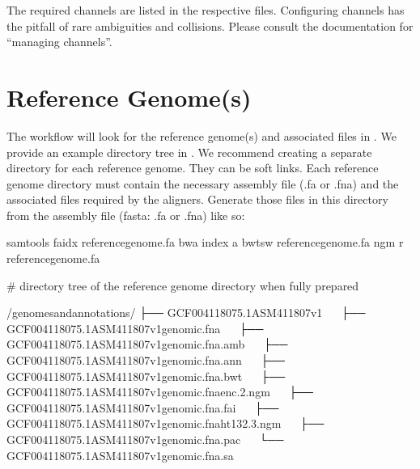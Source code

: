 \documentclass[letterpaper,10pt,english]{sphinxmanual}
\begin{document}
The required channels are listed in the respective  files. Configuring channels has the pitfall of rare ambiguities and collisions. Please consult the  documentation for “managing channels”.


\section{Reference Genome(s)}
\label{\detokenize{index:reference-genome-s}}
The workflow will look for the reference genome(s) and associated files in . We provide an example directory tree in . We recommend creating a separate directory for each reference genome. They can be soft links. Each reference genome directory must contain the necessary assembly file (.fa or .fna) and the associated files required by the aligners. Generate those files in this directory from the assembly file (fasta: .fa or .fna) like so:

\begin{sphinxVerbatim}[commandchars=\\\{\}]
\PYGZdl{} samtools faidx \PYGZlt{}reference\PYGZhy{}genome.fa\PYGZgt{}
\PYGZdl{} bwa index \PYGZhy{}a bwtsw \PYGZlt{}reference\PYGZhy{}genome.fa\PYGZgt{}
\PYGZdl{} ngm \PYGZhy{}r \PYGZlt{}reference\PYGZhy{}genome.fa\PYGZgt{}
\end{sphinxVerbatim}

\# directory tree of the reference genome directory when fully prepared

\begin{sphinxVerbatim}[commandchars=\\\{\}]
\PYGZti{}/genomes\PYGZus{}and\PYGZus{}annotations/
├── GCF\PYGZus{}004118075.1\PYGZus{}ASM411807v1
   ├── GCF\PYGZus{}004118075.1\PYGZus{}ASM411807v1\PYGZus{}genomic.fna
   ├── GCF\PYGZus{}004118075.1\PYGZus{}ASM411807v1\PYGZus{}genomic.fna.amb
   ├── GCF\PYGZus{}004118075.1\PYGZus{}ASM411807v1\PYGZus{}genomic.fna.ann
   ├── GCF\PYGZus{}004118075.1\PYGZus{}ASM411807v1\PYGZus{}genomic.fna.bwt
   ├── GCF\PYGZus{}004118075.1\PYGZus{}ASM411807v1\PYGZus{}genomic.fna\PYGZhy{}enc.2.ngm
   ├── GCF\PYGZus{}004118075.1\PYGZus{}ASM411807v1\PYGZus{}genomic.fna.fai
   ├── GCF\PYGZus{}004118075.1\PYGZus{}ASM411807v1\PYGZus{}genomic.fna\PYGZhy{}ht\PYGZhy{}13\PYGZhy{}2.3.ngm
   ├── GCF\PYGZus{}004118075.1\PYGZus{}ASM411807v1\PYGZus{}genomic.fna.pac
   └── GCF\PYGZus{}004118075.1\PYGZus{}ASM411807v1\PYGZus{}genomic.fna.sa
\end{sphinxVerbatim}
\end{document}
